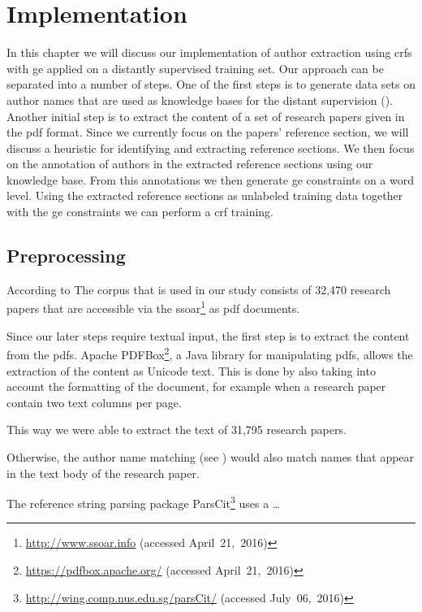 \chapter{Implementation}\label{cha:implementation}

In this chapter we will discuss our implementation of author extraction using \glspl{crf} with \gls{ge} applied on a distantly supervised training set.
Our approach can be separated into a number of steps.
One of the first steps is to generate data sets on author names that are used as knowledge bases for the \gls{distant supervision} ().
Another initial step is to extract the content of a set of research papers given in the \gls{pdf} format.
Since we currently focus on the papers' reference section, we will discuss a heuristic for identifying and extracting reference sections.
We then focus on the annotation of authors in the extracted reference sections using our knowledge base.
From this annotations we then generate \gls{ge} constraints on a word level.
Using the extracted reference sections as unlabeled training data together with the \gls{ge} constraints we can perform a \gls{crf} training.


\section{Preprocessing}\label{sec:i-preprocessing}

According to
The corpus that is used in our study consists of 32,470 research papers that are accessible via the \gls{ssoar}\footnote{\url{http://www.ssoar.info} (accessed April~21,~2016)} as \gls{pdf} documents.

Since our later steps require textual input, the first step is to extract the content from the \glspl{pdf}.
Apache PDFBox\footnote{\url{https://pdfbox.apache.org/} (accessed April~21,~2016)}, a Java library for manipulating \glspl{pdf}, allows the extraction of the content as Unicode text.
This is done by also taking into account the formatting of the document, for example when a research paper contain two text columns per page.

This way we were able to extract the text of 31,795 research papers.

\bigskip

Otherwise, the author name matching (see ) would also match names that appear in the text body of the research paper.

The reference string parsing package ParsCit\footnote{\url{http://wing.comp.nus.edu.sg/parsCit/} (accessed July~06,~2016)} uses a \dots

